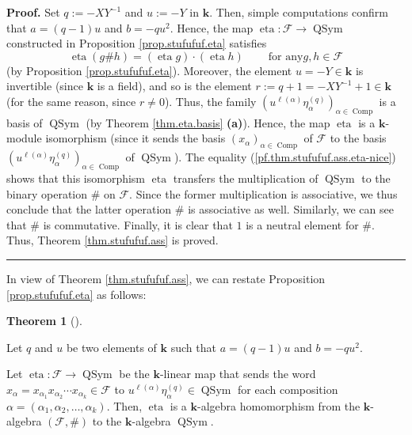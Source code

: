 \documentclass[numbers=enddot,12pt,final,onecolumn,notitlepage]{scrartcl}%
\theoremstyle{definition}
\newtheorem{theo}{Theorem}[section]
\newenvironment{theorem}[1][]
{\begin{theo}[#1]\begin{leftbar}}
{\end{leftbar}\end{theo}}
\newenvironment{proof}[1][Proof]{\noindent\textbf{#1.} }{\ \rule{0.5em}{0.5em}}
\begin{document}
\begin{proof}
Set $q:=-XY^{-1}$ and $u:=-Y$ in $\mathbf{k}$. Then, simple computations
confirm that $a=\left(  q-1\right)  u$ and $b=-qu^{2}$. Hence, the map
$\operatorname*{eta}:\mathcal{F}\rightarrow\operatorname*{QSym}$ constructed
in Proposition \ref{prop.stufufuf.eta} satisfies
\begin{equation}
\operatorname*{eta}\left(  g\#h\right)  =\left(  \operatorname*{eta}g\right)
\cdot\left(  \operatorname*{eta}h\right)  \ \ \ \ \ \ \ \ \ \ \text{for any
}g,h\in\mathcal{F} \label{pf.thm.stufufuf.ass.eta-nice}%
\end{equation}
(by Proposition \ref{prop.stufufuf.eta}). Moreover, the element $u=-Y\in
\mathbf{k}$ is invertible (since $\mathbf{k}$ is a field), and so is the
element $r:=q+1=-XY^{-1}+1\in\mathbf{k}$ (for the same reason, since $r\neq
0$). Thus, the family $\left(  u^{\ell\left(  \alpha\right)  }\eta_{\alpha
}^{\left(  q\right)  }\right)  _{\alpha\in\operatorname*{Comp}}$ is a basis of
$\operatorname*{QSym}$ (by Theorem \ref{thm.eta.basis} \textbf{(a)}). Hence,
the map $\operatorname*{eta}$ is a $\mathbf{k}$-module isomorphism (since it
sends the basis $\left(  x_{\alpha}\right)  _{\alpha\in\operatorname*{Comp}}$
of $\mathcal{F}$ to the basis $\left(  u^{\ell\left(  \alpha\right)  }%
\eta_{\alpha}^{\left(  q\right)  }\right)  _{\alpha\in\operatorname*{Comp}}$
of $\operatorname*{QSym}$). The equality (\ref{pf.thm.stufufuf.ass.eta-nice})
shows that this isomorphism $\operatorname*{eta}$ transfers the multiplication
of $\operatorname*{QSym}$ to the binary operation $\#$ on $\mathcal{F}$. Since
the former multiplication is associative, we thus conclude that the latter
operation $\#$ is associative as well. Similarly, we can see that $\#$ is
commutative. Finally, it is clear that $1$ is a neutral element for $\#$.
Thus, Theorem \ref{thm.stufufuf.ass} is proved.
\end{proof}

In view of Theorem \ref{thm.stufufuf.ass}, we can restate Proposition
\ref{prop.stufufuf.eta} as follows:

\begin{theorem}
\label{thm.stufufuf.eta-mor}Let $q$ and $u$ be two elements of $\mathbf{k}$
such that $a=\left(  q-1\right)  u$ and $b=-qu^{2}$.

Let $\operatorname*{eta}:\mathcal{F}\rightarrow\operatorname*{QSym}$ be the
$\mathbf{k}$-linear map that sends the word $x_{\alpha}=x_{\alpha_{1}%
}x_{\alpha_{2}}\cdots x_{\alpha_{k}}\in\mathcal{F}$ to $u^{\ell\left(
\alpha\right)  }\eta_{\alpha}^{\left(  q\right)  }\in\operatorname*{QSym}$ for
each composition $\alpha=\left(  \alpha_{1},\alpha_{2},\ldots,\alpha
_{k}\right)  $. Then, $\operatorname*{eta}$ is a $\mathbf{k}$-algebra
homomorphism from the $\mathbf{k}$-algebra $\left(  \mathcal{F},\#\right)  $
to the $\mathbf{k}$-algebra $\operatorname*{QSym}$.
\end{theorem}
\end{document}
